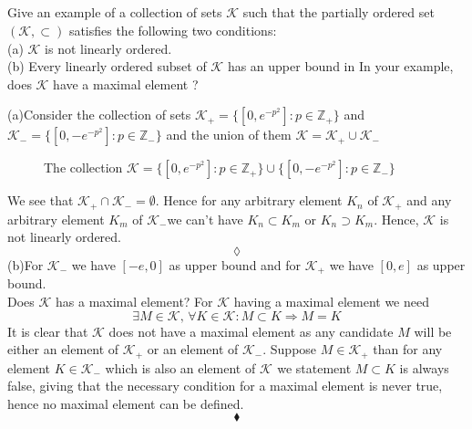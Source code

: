 \subsection{}
\begin{tcolorbox}
Give an example of a collection of sets $\mathscr{K}$ such that the partially ordered set $(\mathscr{K}, \subset)$ satisfies the following two conditions: \\
(a) $\mathscr{K}$ is not linearly ordered.\\
(b) Every linearly ordered subset of $\mathscr{K}$ has an upper bound in In your example, does $\mathscr{K}$ have a maximal element ? 
\end{tcolorbox}
$$ $$
(a)Consider the collection of sets $\mathscr{K}_{+} = \{[0, e^{-p^2}]:p\in \mathbb{Z}_{+}\}$ and $\mathscr{K}_{-} = \{[0, -e^{-p^2}]:p\in \mathbb{Z}_{-}\}$ and the union of them $\mathscr{K} = \mathscr{K}_{+}\cup \mathscr{K}_{-}$
\begin{figure}[H]%
    \centering
    
\caption{The collection   $\mathscr{K} =  \{[0, e^{-p^2}]:p\in \mathbb{Z}_{+}\}\cup  \{[0, -e^{-p^2}]:p\in \mathbb{Z}_{-}\}$}
\label{fig:fig_p8b}
\end{figure}
We see that $\mathscr{K}_{+}\cap \mathscr{K}_{-}=\emptyset$. Hence for any arbitrary element $K_n$ of $\mathscr{K}_{+}$ and any arbitrary element $K_m$ of $\mathscr{K}_{-}$we can't have $K_n\subset K_m$ or $K_n\supset K_m$. Hence, $\mathscr{K}$ is not linearly ordered.
$$\lozenge$$
(b)For $\mathscr{K}_{-}$ we have $[-e,0]$ as upper bound and for  $\mathscr{K}_{+}$ we have $[0,e]$ as upper bound. \\
Does $\mathscr{K}$ has a maximal element? For $\mathscr{K}$  having a maximal element we need 
$$\exists M\in \mathscr{K},\,\forall K\in \mathscr{K}: M\subset K\Rightarrow M=K$$ 
It is clear that $\mathscr{K}$ does not have a maximal element as  any candidate $M$ will be either an element of $\mathscr{K}_{+}$ or an element of $\mathscr{K}_{-}$. Suppose $M\in \mathscr{K}_{+}$ than for any element $K\in \mathscr{K}_{-}$ which is also an element of $\mathscr{K}_{}$ we statement $M\subset K$ is always false, giving that the necessary condition for a maximal element is never true, hence no maximal element can be defined.
$$\blacklozenge$$

